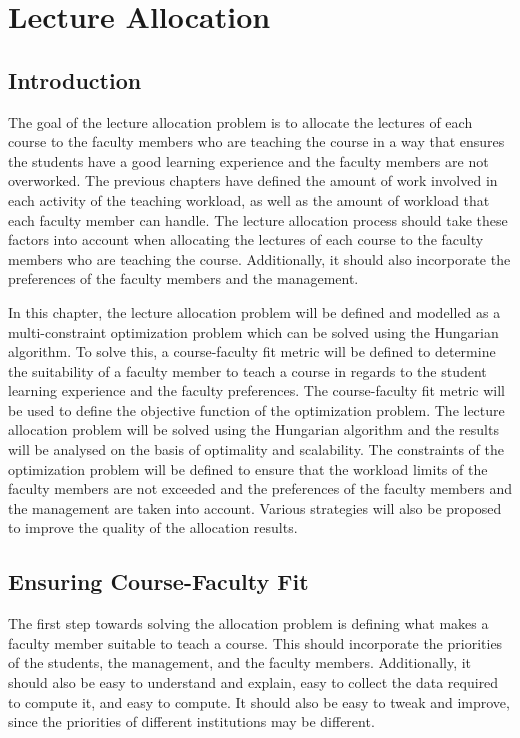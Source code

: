 
\chapter{Lecture Allocation}

\section{Introduction}

The goal of the lecture allocation problem is to allocate the lectures of each course to the faculty members who are teaching the course in a way that ensures the students have a good learning experience and the faculty members are not overworked. The previous chapters have defined the amount of work involved in each activity of the teaching workload, as well as the amount of workload that each faculty member can handle. The lecture allocation process should take these factors into account when allocating the lectures of each course to the faculty members who are teaching the course. Additionally, it should also incorporate the preferences of the faculty members and the management.

In this chapter, the lecture allocation problem will be defined and modelled as a multi-constraint optimization problem which can be solved using the Hungarian algorithm. To solve this, a course-faculty fit metric will be defined to determine the suitability of a faculty member to teach a course in regards to the student learning experience and the faculty preferences. The course-faculty fit metric will be used to define the objective function of the optimization problem. The lecture allocation problem will be solved using the Hungarian algorithm and the results will be analysed on the basis of optimality and scalability. The constraints of the optimization problem will be defined to ensure that the workload limits of the faculty members are not exceeded and the preferences of the faculty members and the management are taken into account. Various strategies will also be proposed to improve the quality of the allocation results.


\section{Ensuring Course-Faculty Fit}

The first step towards solving the allocation problem is defining what makes a faculty member suitable to teach a course. This should incorporate the priorities of the students, the management, and the faculty members. Additionally, it should also be easy to understand and explain, easy to collect the data required to compute it, and easy to compute. It should also be easy to tweak and improve, since the priorities of different institutions may be different.


